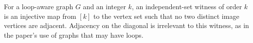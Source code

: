 \begin{definition}
For a loop-aware graph $G$ and an integer $k$, an independent-set witness of
order $k$ is an injective map from $[k]$ to the vertex set such that no two
distinct image vertices are adjacent.  Adjacency on the diagonal is irrelevant
to this witness, as in the paper's use of graphs that may have loops.
\end{definition}
